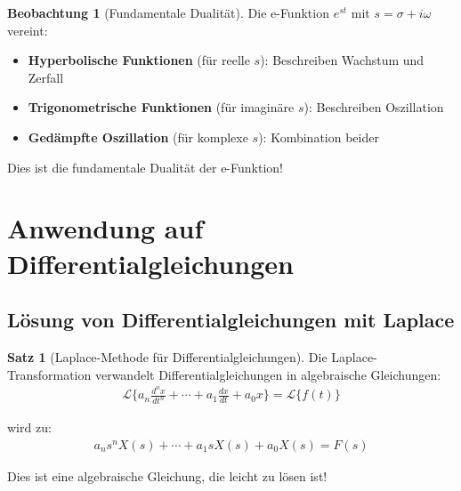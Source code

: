 ﻿\documentclass[a4paper,12pt]{report}
\theoremstyle{definition}
\newtheorem{satz}{Satz}
\newtheorem{beobachtung}{Beobachtung}
\begin{document}
	\begin{beobachtung}[Fundamentale Dualität]
		Die e-Funktion $e^{st}$ mit $s = \sigma + i\omega$ vereint:
		\begin{itemize}
			\item[-] \textbf{Hyperbolische Funktionen} (für reelle $s$): Beschreiben Wachstum und Zerfall
			\item[-] \textbf{Trigonometrische Funktionen} (für imaginäre $s$): Beschreiben Oszillation
			\item[-] \textbf{Gedämpfte Oszillation} (für komplexe $s$): Kombination beider
		\end{itemize}
		
		Dies ist die fundamentale Dualität der e-Funktion!
	\end{beobachtung}
	
	\section{Anwendung auf Differentialgleichungen}
	
	\subsection{Lösung von Differentialgleichungen mit Laplace}
	
	\begin{satz}[Laplace-Methode für Differentialgleichungen]
		Die Laplace-Transformation verwandelt Differentialgleichungen in algebraische Gleichungen:
		\begin{align}
			\mathcal{L}\{a_n \frac{d^n x}{dt^n} + \cdots + a_1 \frac{dx}{dt} + a_0 x\} = \mathcal{L}\{f(t)\}
		\end{align}
		
		wird zu:
		\begin{align}
			a_n s^n X(s) + \cdots + a_1 s X(s) + a_0 X(s) = F(s)
		\end{align}
		
		Dies ist eine algebraische Gleichung, die leicht zu lösen ist!
	\end{satz}
	
\end{document}
